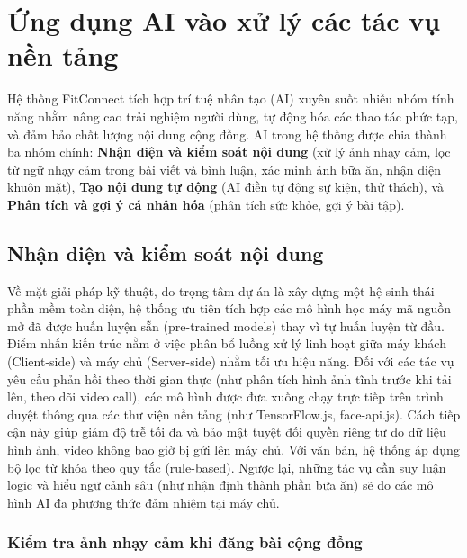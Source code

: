 \label{chap:implementation}

\section{Ứng dụng AI vào xử lý các tác vụ nền tảng}
\label{sec:impl_ai_smart}

Hệ thống FitConnect tích hợp trí tuệ nhân tạo (AI) xuyên suốt nhiều nhóm tính năng nhằm nâng cao trải nghiệm người dùng, tự động hóa các thao tác phức tạp, và đảm bảo chất lượng nội dung cộng đồng. AI trong hệ thống được chia thành ba nhóm chính: \textbf{Nhận diện và kiểm soát nội dung} (xử lý ảnh nhạy cảm, lọc từ ngữ nhạy cảm trong bài viết và bình luận, xác minh ảnh bữa ăn, nhận diện khuôn mặt), \textbf{Tạo nội dung tự động} (AI điền tự động sự kiện, thử thách), và \textbf{Phân tích và gợi ý cá nhân hóa} (phân tích sức khỏe, gợi ý bài tập).

\subsection{Nhận diện và kiểm soát nội dung}
\label{subsec:impl_ai_content_control}

Về mặt giải pháp kỹ thuật, do trọng tâm dự án là xây dựng một hệ sinh thái phần mềm toàn diện, hệ thống ưu tiên tích hợp các mô hình học máy mã nguồn mở đã được huấn luyện sẵn (pre-trained models) thay vì tự huấn luyện từ đầu. Điểm nhấn kiến trúc nằm ở việc phân bổ luồng xử lý linh hoạt giữa máy khách (Client-side) và máy chủ (Server-side) nhằm tối ưu hiệu năng. Đối với các tác vụ yêu cầu phản hồi theo thời gian thực (như phân tích hình ảnh tĩnh trước khi tải lên, theo dõi video call), các mô hình được đưa xuống chạy trực tiếp trên trình duyệt thông qua các thư viện nền tảng (như TensorFlow.js, face-api.js). Cách tiếp cận này giúp giảm độ trễ tối đa và bảo mật tuyệt đối quyền riêng tư do dữ liệu hình ảnh, video không bao giờ bị gửi lên máy chủ. Với văn bản, hệ thống áp dụng bộ lọc từ khóa theo quy tắc (rule-based). Ngược lại, những tác vụ cần suy luận logic và hiểu ngữ cảnh sâu (như nhận định thành phần bữa ăn) sẽ do các mô hình AI đa phương thức đảm nhiệm tại máy chủ.

\subsubsection{Kiểm tra ảnh nhạy cảm khi đăng bài cộng đồng}

